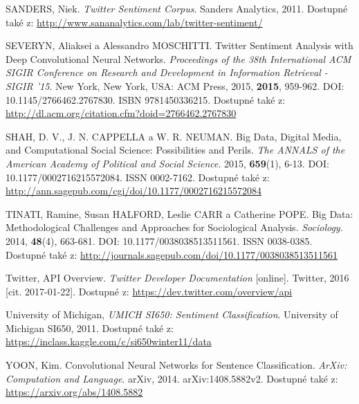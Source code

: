 \documentclass[12pt, a4paper]{article}
\numberwithin{equation}{section} 	%
\begin{document}
\begin{thebibliography}{99}
    SANDERS, Niek. \textit{Twitter Sentiment Corpus}. Sanders Analytics, 2011. Dostupné také z: \url{http://www.sananalytics.com/lab/twitter-sentiment/}

    SEVERYN, Aliaksei a Alessandro MOSCHITTI. Twitter Sentiment Analysis with Deep Convolutional Neural Networks. \textit{Proceedings of the 38th International ACM SIGIR Conference on Research and Development in Information Retrieval - SIGIR '15}. New York, New York, USA: ACM Press, 2015, \textbf{2015}, 959-962. DOI: 10.1145/2766462.2767830. ISBN 9781450336215. Dostupné také z: \url{http://dl.acm.org/citation.cfm?doid=2766462.2767830}

    SHAH, D. V., J. N. CAPPELLA a W. R. NEUMAN. Big Data, Digital Media, and Computational Social Science: Possibilities and Perils. \textit{The ANNALS of the American Academy of Political and Social Science}. 2015, \textbf{659}(1), 6-13. DOI: 10.1177/0002716215572084. ISSN 0002-7162. Dostupné také z: \url{http://ann.sagepub.com/cgi/doi/10.1177/0002716215572084}

    TINATI, Ramine, Susan HALFORD, Leslie CARR a Catherine POPE. Big Data: Methodological Challenges and Approaches for Sociological Analysis. \textit{Sociology}. 2014, \textbf{48}(4), 663-681. DOI: 10.1177/0038038513511561. ISSN 0038-0385. Dostupné také z: \url{http://journals.sagepub.com/doi/10.1177/0038038513511561}

    Twitter, API Overview. \textit{Twitter Developer Documentation} [online]. Twitter, 2016 [cit. 2017-01-22]. Dostupné z: \url{https://dev.twitter.com/overview/api}

    University of Michigan, \textit{UMICH SI650: Sentiment Classification}. University of Michigan SI650, 2011. Dostupné také z: \url{https://inclass.kaggle.com/c/si650winter11/data}

    YOON, Kim. Convolutional Neural Networks for Sentence Classification. \textit{ArXiv: Computation and Language}. arXiv, 2014. arXiv:1408.5882v2. Dostupné také z: \url{https://arxiv.org/abs/1408.5882}

\end{thebibliography}
\end{document}
